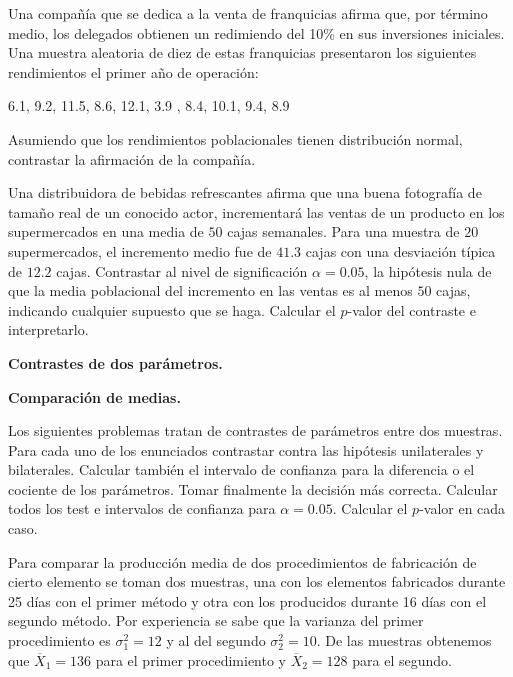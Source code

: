 \documentclass[12pt]{article}\usepackage[]{graphicx}\usepackage[]{color}
\begin{document}
\begin{prob}
Una compañía que se dedica a la venta de franquicias afirma que, por término medio, los
delegados obtienen un redimiendo del 10\% en sus inversiones iniciales. Una muestra
aleatoria de diez de estas franquicias presentaron los siguientes rendimientos el primer
año de operación:

6.1, 9.2, 11.5, 8.6, 12.1, 3.9 , 8.4, 10.1, 9.4, 8.9

Asumiendo que los rendimientos poblacionales tienen distribución normal, contrastar la
afirmación de la compañía.
\end{prob}


\begin{prob}
Una distribuidora de bebidas refrescantes afirma que una buena fotografía de tamaño real de
un conocido actor, incrementará las ventas de un producto en los supermercados en una media
de $50$ cajas semanales. Para una muestra de $20$ supermercados, el incremento medio fue de
$41.3$ cajas con una desviación típica de $12.2$ cajas. Contrastar al nivel de
significación $\alpha=0.05$, la hipótesis nula de que la media poblacional del incremento
en las ventas es al menos $50$ cajas, indicando cualquier supuesto que se haga. Calcular el
$p$-valor del contraste e interpretarlo.
\end{prob}



\newpage



\textbf{Contrastes de dos parámetros.}

\textbf{Comparación de medias.}

Los siguientes problemas tratan de contrastes de parámetros entre dos muestras. Para cada uno de los enunciados contrastar contra las  hipótesis unilaterales y bilaterales. Calcular también el intervalo de confianza para la diferencia o el cociente de los parámetros. Tomar finalmente la decisión más correcta. Calcular todos los test e intervalos de confianza para $\alpha=0.05$. Calcular el $p$-valor en cada caso. 

\begin{prob}
Para comparar la producción  media de dos procedimientos de fabricación de cierto elemento
se toman dos muestras, una con los elementos fabricados durante 25 días con el primer
método y otra con los producidos durante 16 días con el segundo método. Por experiencia se
sabe que la varianza del primer procedimiento es $\sigma_{1}^2=12$ y al del segundo
$\sigma_{2}^2=10$. De las muestras obtenemos que $\overline{X}_{1}=136$ para el primer
procedimiento y $\overline{X}_{2}=128$ para el segundo. 
\end{prob}
\end{document}
